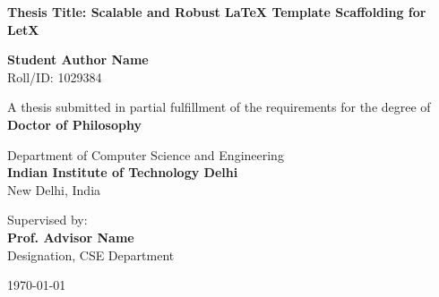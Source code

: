 \begin{titlepage}
\begin{center}
    \vspace*{1cm}
    
    
    \vspace{1.5cm}
    
    {\huge \bfseries \color{primary} Thesis Title: Scalable and Robust LaTeX Template Scaffolding for LetX}
    
    \vspace{1.5cm}
    
    {\Large \bfseries Student Author Name} \\
    \vspace{0.2cm}
    {Roll/ID: 1029384}
    
    \vspace{1.5cm}
    
    {A thesis submitted in partial fulfillment of the requirements for the degree of} \\
    \vspace{0.3cm}
    {\large \bfseries \color{secondary} Doctor of Philosophy}
    
    \vspace{1.5cm}
    
    {Department of Computer Science and Engineering} \\
    \vspace{0.2cm}
    {\large \bfseries \color{primary} Indian Institute of Technology Delhi} \\
    \vspace{0.1cm}
    {New Delhi, India}
    
    \vfill
    
    {Supervised by:} \\
    {\large \bfseries Prof. Advisor Name} \\
    {Designation, CSE Department}
    
    \vspace{1cm}
    
    {\large \today}
    
\end{center}
\end{titlepage}
